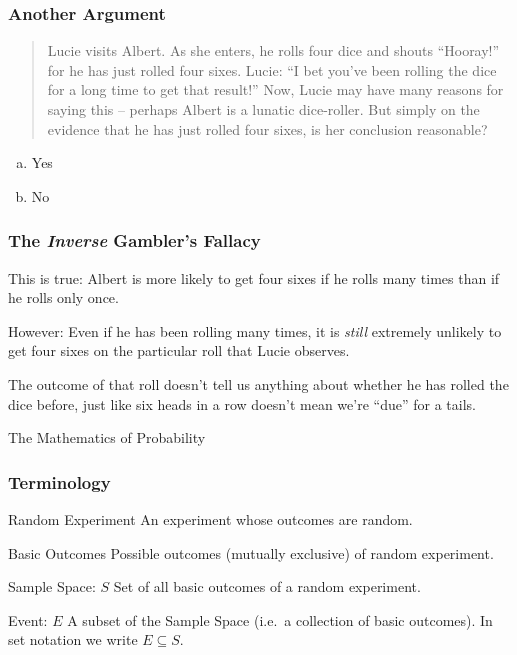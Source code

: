 \documentclass[handout]{beamer}
\begin{document}
\begin{frame}
\frametitle{Another Argument}
\begin{quote}
Lucie visits Albert. As she enters, he rolls four dice and shouts ``Hooray!'' for he has just rolled four sixes. Lucie: ``I bet you've been rolling the dice for a long time to get that result!'' Now, Lucie may have many reasons for saying this -- perhaps Albert is a lunatic dice-roller. But simply on the evidence that he has just rolled four sixes, is her conclusion reasonable?
\end{quote}

\begin{enumerate}[(a)]
	\item Yes
	\item No
\end{enumerate}

\end{frame}
\begin{frame}
\frametitle{The \emph{Inverse} Gambler's Fallacy}

\begin{block}{This is true:}
Albert is more likely to get four sixes if he rolls many times than if he rolls only once.\end{block}
\pause
\begin{block}{However:} Even if he has been rolling many times, it is \emph{still} extremely unlikely to get four sixes \alert{on the particular roll that Lucie observes}.\end{block}
\vspace{2em}
\pause
\begin{block}{The outcome of that roll doesn't tell us anything about whether he has rolled the dice before, just like six heads in a row doesn't mean we're ``due'' for a tails.}\end{block}

\end{frame}
\begin{frame}
	\begin{center}
		\Huge The Mathematics of Probability
	\end{center}
\end{frame}
\begin{frame}
\frametitle{Terminology}
\pause
\begin{block}{Random Experiment}
An experiment whose outcomes are random.
\end{block}
\pause
\begin{block}{Basic Outcomes}
Possible outcomes (mutually exclusive) of random experiment.
\end{block}
\pause
\begin{block}{Sample Space: $S$}
Set of all basic outcomes of a random experiment.
\end{block}

\pause
\begin{block}{Event: $E$}
A subset of the Sample Space (i.e.\ a collection of basic outcomes). In set notation we write $E \subseteq S$.
\end{block}

\end{frame}
\end{document}
